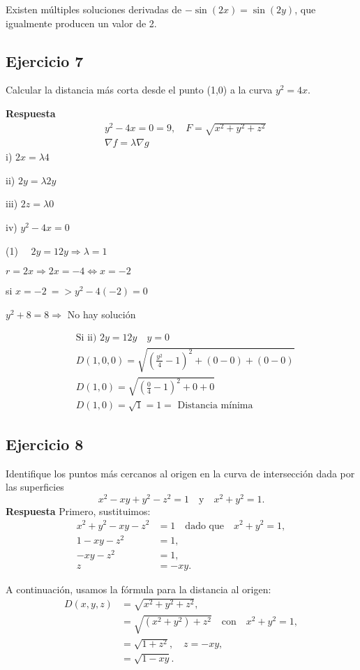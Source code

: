 \documentclass{report}
\begin{document}
Existen múltiples soluciones derivadas de $-\sin(2 x) = \sin(2 y)$, que igualmente producen un valor de 2.\subsection{Ejercicio 7}
Calcular la distancia más corta desde el punto (1,0) a la curva $y^2=4x$.

\textbf{Respuesta}
$$
\begin{aligned}
&y^2 - 4x = 0 = 9, \quad F = \sqrt{x^2+y^2+z^2} \\
&\nabla f = \lambda \nabla g
\end{aligned}
$$
i) $2x=\lambda 4$

ii) $2y=\lambda 2y$

iii) $2z=\lambda 0$

iv) $y^2 - 4x = 0$ 

(1) $\quad 2y=12y \Rightarrow \lambda=1$

$r=2x \Rightarrow 2x=-4 \Leftrightarrow x=-2$

si $x=-2 \ => y^2-4(-2)=0$ 

$y^2+8=8 \Rightarrow$ No hay solución

$$
\begin{aligned}
&\text{Si } \text{ii) } 2y=12y \quad y=0 \\
&D(1,0,0) = \sqrt{\left(\frac{y^2}{4} - 1\right)^2 + (0-0) + (0-0)} \\
&D(1,0)=\sqrt{\left(\frac{0}{4} - 1\right)^2 + 0 + 0} \\
&D(1,0) = \sqrt{1} = 1 = \text{ Distancia mínima }
\end{aligned}
$$\subsection{Ejercicio 8}
Identifique los puntos más cercanos al origen en la curva de intersección dada por las superficies 
$$
x^{2}-x y+y^{2}-z^{2}=1 \quad \text{y} \quad x^{2}+y^{2}=1.
$$
\textbf{Respuesta}
Primero, sustituimos:
$$
\begin{aligned}
x^{2}+y^{2}-x y-z^{2} &= 1 \quad \text{dado que} \quad x^{2}+y^{2}=1, \\
1-x y-z^{2} &= 1, \\
-x y-z^{2} &= 1, \\
z &= -x y.
\end{aligned}
$$

A continuación, usamos la fórmula para la distancia al origen:
$$
\begin{aligned}
D(x, y, z) &= \sqrt{x^{2}+y^{2}+z^{2}}, \\
&= \sqrt{\left(x^{2}+y^{2}\right)+z^{2}} \quad \text{con} \quad x^{2}+y^{2}=1, \\
&= \sqrt{1+z^{2}}, \quad z = -x y, \\
&= \sqrt{1-x y}.
\end{aligned}
$$
\end{document}
